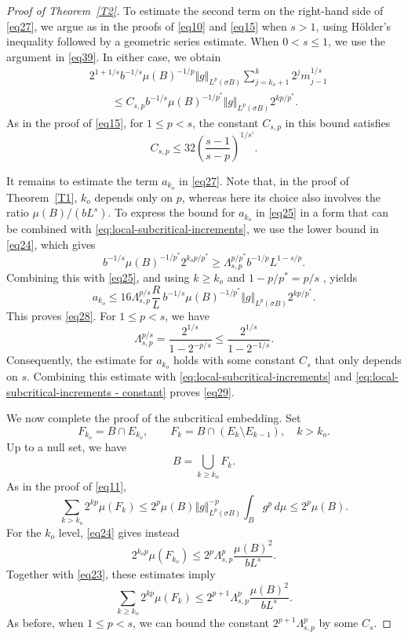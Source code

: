 \documentclass[10pt,a4paper]{amsart}
\begin{document}
\begin{proof}[Proof of Theorem~\ref{T2}]
To estimate the second term on the right-hand side of \eqref{eq27},
we argue as in the proofs of \eqref{eq10} and \eqref{eq15} when
$s>1$, using H\"older's inequality followed by a geometric series
estimate. When $0<s\leq1$, we use the argument in \eqref{eq39}.
In either case, we obtain
\begin{equation}
\label{eq:local-subcritical-increments}
\begin{aligned}
&2^{1+1/s}b^{-1/s}\mu(B)^{-1/p}
 \Vert g\Vert_{L^p(\sigma B)}
 \sum_{j=k_o+1}^k2^jm_{j-1}^{1/s}\\
&\qquad\leq
 C_{s,p}b^{-1/s}\mu(B)^{-1/p^*}
 \Vert g\Vert_{L^p(\sigma B)}2^{kp/p^*}.
\end{aligned}
\end{equation}
As in the proof of \eqref{eq15}, for $1\leq p<s$, the constant $C_{s,p}$ in this bound
satisfies
\begin{equation}
\label{eq:local-subcritical-increments - constant}
 C_{s,p}\leq
 32\left(\frac{s-1}{s-p}\right)^{1/s'}.
\end{equation}

It remains to estimate the term $a_{k_o}$ in \eqref{eq27}.
Note that, in the proof of Theorem~\ref{T1}, $k_o$ depends only on $p$,
whereas here its choice also involves the ratio $\mu(B)/(bL^s)$.
To express the bound for $a_{k_o}$ in \eqref{eq25} in a form
that can be combined with \eqref{eq:local-subcritical-increments},
we use the lower bound in \eqref{eq24}, which gives
\[
 b^{-1/s}\mu(B)^{-1/p^*}2^{k_op/p^*}
 \geq \Lambda_{s,p}^{p/p^*}b^{-1/p}L^{1-s/p}.
\]
Combining this with \eqref{eq25}, and using $k\geq k_o$ and 
$1-p/p^*=p/s$%
, yields
\[
 a_{k_o}\leq 16\Lambda_{s,p}^{p/s}\frac RL\,b^{-1/s}\mu(B)^{-1/p^*}
 \Vert g\Vert_{L^p(\sigma B)}2^{kp/p^*}.
\]
This proves \eqref{eq28}. 
For $1\leq p<s$, we have
\[
 \Lambda_{s,p}^{p/s}
 =\frac{2^{1/s}}{1-2^{-p/s}}
 \leq\frac{2^{1/s}}{1-2^{-1/s}}.
\]
Consequently, the estimate for $a_{k_o}$ holds with some constant $C_s$
that only depends on $s$.
Combining this estimate with
\eqref{eq:local-subcritical-increments} and
\eqref{eq:local-subcritical-increments - constant}
proves \eqref{eq29}.



We now complete the proof of the subcritical embedding. Set
\begin{equation}
\label{eq:F sets}
F_{k_o}=B\cap E_{k_o},
 \qquad
 F_k=B\cap(E_k\setminus E_{k-1}),\quad k>k_o.
\end{equation}
Up to a null set, we have
\[
B=\bigcup_{k\geq k_o}F_k.
\]
 As in the proof of
\eqref{eq11},
\[
 \sum_{k>k_o}2^{kp}\mu(F_k)
 \leq 2^p\mu(B)\Vert g\Vert_{L^p(\sigma B)}^{-p}
       \int_B g^p\,d\mu
 \leq 2^p\mu(B).
\]
For the $k_o$ level, \eqref{eq24} gives instead
\[
 2^{k_op}\mu(F_{k_o})
 \leq 2^p\Lambda_{s,p}^p\frac{\mu(B)^2}{bL^s}.
\]
Together with \eqref{eq23}, these estimates imply
%
\begin{equation}
\label{eq30}
 \sum_{k\geq k_o}2^{kp}\mu(F_k)
 \leq 2^{p+1}\Lambda_{s,p}^p\frac{\mu(B)^2}{bL^s}.
\end{equation}
As before, when $1\leq p<s$, we can bound the constant $2^{p+1}\Lambda_{s,p}^p$ by some $C_s$.



\end{proof}
\end{document}
